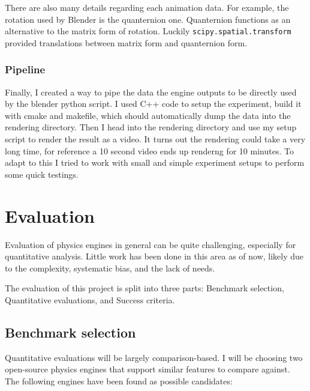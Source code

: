 \documentclass[12pt,a4paper,twoside,openright]{report}
\newcommand{\code}{\texttt}
\begin{document}
There are also many details regarding each animation data. For example, the rotation used by Blender is the quanternion one. Quanternion functions as an alternative to the matrix form of rotation. Luckily \code{scipy.spatial.transform} provided translations between matrix form and quanternion form.

\subsection{Pipeline}

Finally, I created a way to pipe the data the engine outputs to be directly used by the blender python script. I used C++ code to setup the experiment, build it with cmake and makefile, which should automatically dump the data into the rendering directory. Then I head into the rendering directory and use my setup script to render the result as a video. It turns out the rendering could take a very long time, for reference a 10 second video ends up renderng for 10 minutes. To adapt to this I tried to work with small and simple experiment setups to perform some quick testings.



\chapter{Evaluation}\label{chap4}


Evaluation of physics engines in general can be quite challenging, 
especially for quantitative analysis.
Little work has been done in this area as of now, 
likely due to the complexity, systematic bias, and the lack of needs.

The evaluation of this project is split into three parts: Benchmark selection, Quantitative evaluations, and Success criteria.

\section{Benchmark selection}

Quantitative evaluations will be largely comparison-based. 
I will be choosing two open-source physics engines that support similar features to compare against.
The following engines have been found as possible candidates:
\end{document}
